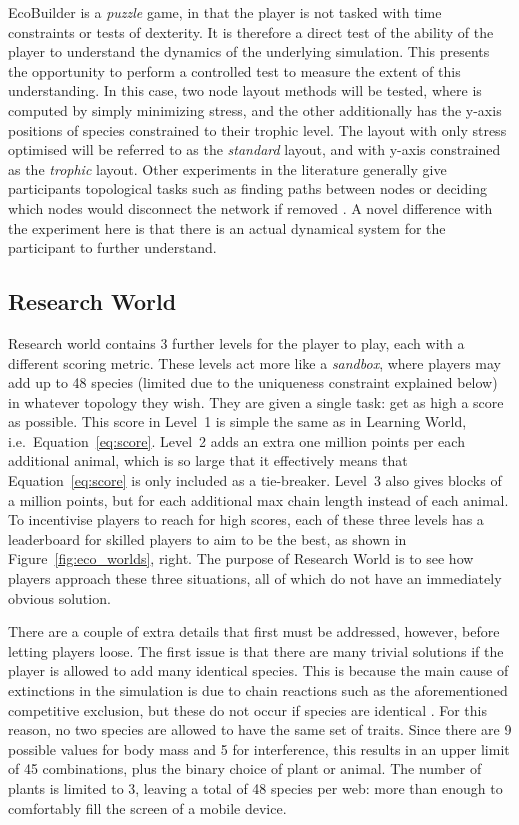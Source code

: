 EcoBuilder is a \emph{puzzle} game, in that the player is not tasked with time constraints or tests of dexterity. It is therefore a direct test of the ability of the player to understand the dynamics of the underlying simulation.
This presents the opportunity to perform a controlled test to measure the extent of this understanding. In this case, two node layout methods will be tested, where is computed by simply minimizing stress, and the other additionally has the y-axis positions of species constrained to their trophic level. The layout with only stress optimised will be referred to as the \emph{standard} layout, and with y-axis constrained as the \emph{trophic} layout.
Other experiments in the literature generally give participants topological tasks such as finding paths between nodes \cite{Bach2017, Okoe2018} or deciding which nodes would disconnect the network if removed \cite{Purchase1997}. A novel difference with the experiment here is that there is an actual dynamical system for the participant to further understand.

\subsection{Research World}
\label{sec:research_world}
Research world contains 3 further levels for the player to play, each with a different scoring metric. These levels act more like a \emph{sandbox}, where players may add up to 48 species (limited due to the uniqueness constraint explained below) in whatever topology they wish.
They are given a single task: get as high a score as possible. This score in Level~1 is simple the same as in Learning World, i.e.\ Equation~\ref{eq:score}. Level~2 adds an extra one million points per each additional animal, which is so large that it effectively means that Equation~\ref{eq:score} is only included as a tie-breaker. 
Level~3 also gives blocks of a million points, but for each additional max chain length instead of each animal.
To incentivise players to reach for high scores, each of these three levels has a leaderboard for skilled players to aim to be the best, as shown in Figure~\ref{fig:eco_worlds}, right.
The purpose of Research World is to see how players approach these three situations, all of which do not have an immediately obvious solution.

There are a couple of extra details that first must be addressed, however, before letting players loose. The first issue is that there are many trivial solutions if the player is allowed to add many identical species. This is because the main cause of extinctions in the simulation is due to chain reactions such as the aforementioned competitive exclusion, but these do not occur if species are identical \cite{Armstrong1980}. For this reason, no two species are allowed to have the same set of traits. Since there are 9 possible values for body mass and 5 for interference, this results in an upper limit of 45 combinations, plus the binary choice of plant or animal. The number of plants is limited to 3, leaving a total of 48 species per web: more than enough to comfortably fill the screen of a mobile device.

